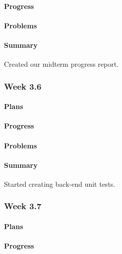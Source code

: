 \documentclass[onecolumn, draftclsnofoot,10pt, compsoc]{article}
\begin{document}
		    \paragraph{Progress} \hfill \break

		    \paragraph{Problems} \hfill \break

		    \paragraph{Summary} \hfill \break
		        Created our midterm progress report.

		\subsubsection{Week 3.6}
		    \paragraph{Plans} \hfill \break

		    \paragraph{Progress} \hfill \break

		    \paragraph{Problems} \hfill \break

		    \paragraph{Summary} \hfill \break
		        Started creating back-end unit tests.

		\subsubsection{Week 3.7}
		    \paragraph{Plans} \hfill \break

		    \paragraph{Progress} \hfill \break
\end{document}
